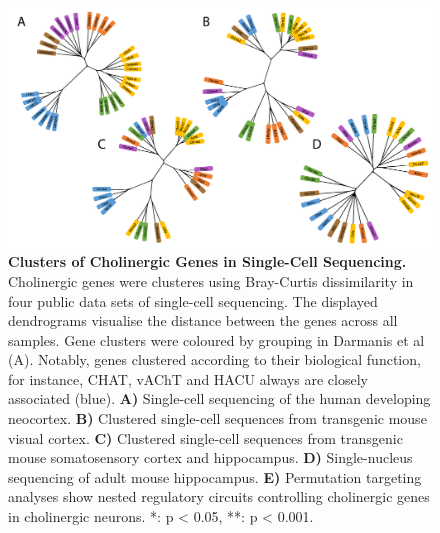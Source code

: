 \begin{figure}
\centering
\includegraphics[width=\textwidth]{figures/chol-clusters}
\caption[Clusters of Cholinergic Genes in Single-Cell Sequencing.]{\textbf{Clusters of Cholinergic Genes in Single-Cell Sequencing.} Cholinergic genes were clusteres using Bray-Curtis dissimilarity in four public data sets of single-cell sequencing. The displayed dendrograms visualise the distance between the genes across all samples. Gene clusters were coloured by grouping in Darmanis et al\cite{Darmanis2015} (A). Notably, genes clustered according to their biological function, for instance, CHAT, vAChT and HACU always are closely associated (blue). \textbf{A)} Single-cell sequencing of the human developing neocortex\cite{Darmanis2015}. \textbf{B)} Clustered single-cell sequences from transgenic mouse visual cortex\cite{Tasic2016}. \textbf{C)} Clustered single-cell sequences from transgenic mouse somatosensory cortex and hippocampus\cite{Zeisel2015}. \textbf{D)} Single-nucleus sequencing of adult mouse hippocampus\cite{Habib2016}. \textbf{E)} Permutation targeting analyses show nested regulatory circuits controlling cholinergic genes in cholinergic neurons. *: p < 0.05, **: p < 0.001.
\label{fig:chol-clusters}}
\end{figure}
